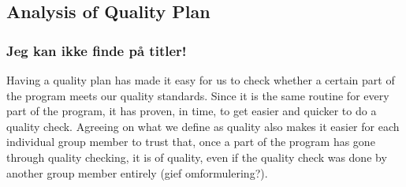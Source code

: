 \subsection{Analysis of Quality Plan}
\subsubsection{Jeg kan ikke finde på titler!}
Having a quality plan has made it easy for us to check whether a certain part of the program meets our quality standards. Since it is the same routine for every part of the program, it has proven, in time, to get easier and quicker to do a quality check. Agreeing on what we define as quality also makes it easier for each individual group member to trust that, once a part of the program has gone through quality checking, it is of quality, even if the quality check was done by another group member entirely (gief omformulering?).